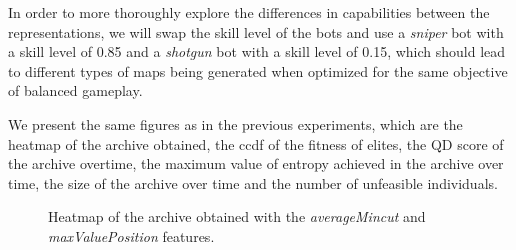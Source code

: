 In order to more thoroughly explore the differences in capabilities between the representations, we will swap the skill level of the bots and use a \textit{sniper} bot with a skill level of 0.85 and a \textit{shotgun} bot with a skill level of 0.15, which should lead to different types of maps being generated when optimized for the same objective of balanced gameplay.

We present the same figures as in the previous experiments, which are the heatmap of the archive obtained, the ccdf of the fitness of elites, the QD score of the archive overtime, the maximum value of entropy achieved in the archive over time, the size of the archive over time and the number of unfeasible individuals. 


\begin{figure}[H]
    \centering
    \qquad
    \caption{Heatmap of the archive obtained with the \textit{averageMincut} and \textit{maxValuePosition} features.}
    \label{fig:heatmap_exp3}
\end{figure}

